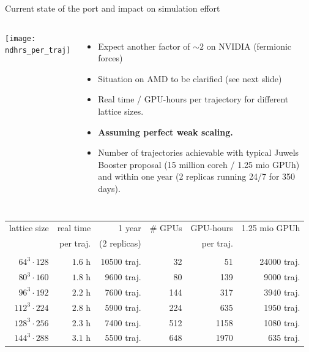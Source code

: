 \documentclass[xcolor={dvipsnames,table}]{beamer}
\begin{document}
\begin{frame}[fragile]{Current state of the port and impact on simulation effort}
  \begin{columns}
      \centering
      \texttt{[image: ndhrs\_per\_traj]}
      \begin{itemize}
        \item Expect another factor of $\sim 2$ on NVIDIA (fermionic forces)
        \vspace{0.2cm}
        \item Situation on AMD to be clarified (see next slide)
        \vspace{0.2cm}
        \item Real time / GPU-hours per trajectory for different lattice sizes.
        \vspace{0.2cm}
        \item \textbf{Assuming perfect weak scaling.}
        \vspace{0.2cm}
      \item Number of trajectories achievable with typical Juwels Booster proposal (15 million coreh / 1.25 mio GPUh) and within one year (2 replicas running 24/7 for 350 days).
      \end{itemize}
  \end{columns}
  \vspace{0.3cm}
  \begin{minipage}{\textwidth}
    \centering
    \begin{tabular}{rrrrrr}
      lattice size     & real time  & 1 year              & \# GPUs & GPU-hours & 1.25 mio GPUh \\
                       & per traj.  & (2 replicas)        &         & per traj. &               \\
      \hline \\                                           
      $64^3\cdot128$   &  $1.6$ h   & 10500 traj.         &  32     &   51      & 24000 traj.   \\
      $80^3\cdot160$   &  $1.8$ h   & 9600 traj.          &  80     &  139      &  9000 traj.   \\
      $96^3\cdot192$   &  $2.2$ h   & 7600 traj.          & 144     &  317      &  3940 traj.   \\
      $112^3\cdot224$  &  $2.8$ h   & 5900 traj.          & 224     &  635      &  1950 traj.   \\    
      $128^3\cdot256$  &  $2.3$ h   & 7400 traj.          & 512     & 1158      &  1080 traj.   \\
      $144^3\cdot288$  &  $3.1$ h   & 5500 traj.          & 648     & 1970      &   635 traj.
    \end{tabular}
  \end{minipage}
\end{frame}
\end{document}
